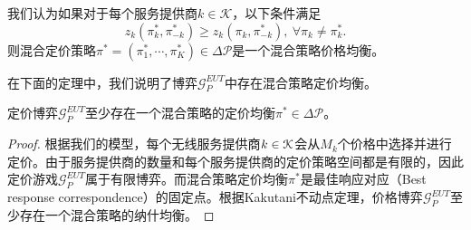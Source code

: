\begin{df}[混合价格策略均衡]
我们认为如果对于每个服务提供商$k\in\mathcal{K}$，以下条件满足
\begin{equation}\label{eq:exrev1}
z_{k}(\pi_{k}^*,\pi_{-k}^*)\ge z_{k}(\pi_{k},\pi_{-k}^*),~\forall \pi_k\ne\pi_k^*.
\end{equation}
则混合定价策略$\pi^*=(\pi_{1}^*,\cdots,\pi_{K}^*)\in\Delta\mathcal{P}$是一个混合策略价格均衡。
\end{df}

在下面的定理中，我们说明了博弈$\mathcal{G}^{EUT}_{P}$中存在混合策略定价均衡。
\begin{thm}\label{thm:exist}
定价博弈$\mathcal{G}^{EUT}_{P}$至少存在一个混合策略的定价均衡$\pi^{*}\in\Delta\mathcal{P}$。
\end{thm}
\begin{proof}
根据我们的模型，每个无线服务提供商$k\in\mathcal{K}$会从$M_k$个价格中选择并进行定价。由于服务提供商的数量和每个服务提供商的定价策略空间都是有限的，因此定价游戏$\mathcal{G}^{EUT}_{P}$属于有限博弈。而混合策略定价均衡$\pi^*$是最佳响应对应（Best response correspondence）的固定点。根据Kakutani不动点定理，价格博弈$\mathcal{G}^{EUT}_{P}$至少存在一个混合策略的纳什均衡\cite{osborne}。
\end{proof}

